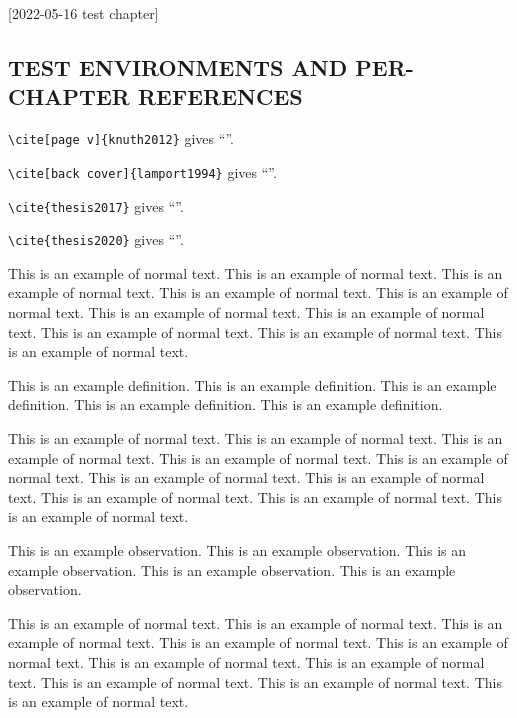 [2022-05-16 test chapter]

\begin{refsection}

\chapter{TEST ENVIRONMENTS AND PER-CHAPTER REFERENCES}

\verb+\cite[page v]{knuth2012}+ gives ``\cite[page v]{knuth2012}''.

\noindent
\verb+\cite[back cover]{lamport1994}+ gives ``\cite[back cover]{lamport1994}''.

\noindent
\verb+\cite{thesis2017}+ gives ``\cite{thesis2017}''.

\noindent
\verb+\cite{thesis2020}+ gives ``\cite{thesis2020}''.

This is an example of normal text.
This is an example of normal text.
This is an example of normal text.
This is an example of normal text.
This is an example of normal text.
This is an example of normal text.
This is an example of normal text.
This is an example of normal text.
This is an example of normal text.
This is an example of normal text.

\begin{definition}
  This is an example definition.
  This is an example definition.
  This is an example definition.
  This is an example definition.
  This is an example definition.
\end{definition}

This is an example of normal text.
This is an example of normal text.
This is an example of normal text.
This is an example of normal text.
This is an example of normal text.
This is an example of normal text.
This is an example of normal text.
This is an example of normal text.
This is an example of normal text.
This is an example of normal text.

\begin{observation}
  This is an example observation.
  This is an example observation.
  This is an example observation.
  This is an example observation.
  This is an example observation.
\end{observation}

This is an example of normal text.
This is an example of normal text.
This is an example of normal text.
This is an example of normal text.
This is an example of normal text.
This is an example of normal text.
This is an example of normal text.
This is an example of normal text.
This is an example of normal text.
This is an example of normal text.


\end{refsection}
